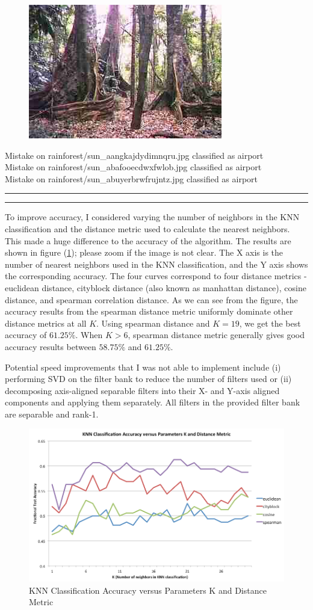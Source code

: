 \documentclass[12pt]{article}
\newcommand{\question}[2] {\vspace{.25in} \hrule\vspace{0.5em} \noindent{\bf #1: #2} \vspace{0.5em} \hrule \vspace{.10in}}
\begin{document}
\begin{figure}
\centering
\includegraphics[width=0.5\linewidth]{../dat/rainforest/sun_aalbylumieujfxrc.jpg}
\end{figure}
Mistake on rainforest/sun\_aangkajdydimnqru.jpg classified as airport \\
Mistake on rainforest/sun\_abafooecdwxfwlob.jpg classified as airport \\
Mistake on rainforest/sun\_abuyerbrwfrujntz.jpg classified as airport \\

\question{3.2}{Improvements in Accuracy}

To improve accuracy, I considered varying the number of neighbors in the KNN classification and the distance metric used to calculate the nearest neighbors. This made a huge difference to the accuracy of the algorithm. The results are shown in figure (\ref{fig:accuracy}); please zoom if the image is not clear. The X axis is the number of nearest neighbors used in the KNN classification, and the Y axis shows the corresponding accuracy. The four curves correspond to four distance metrics - euclidean distance, cityblock distance (also known as manhattan distance), cosine distance, and spearman correlation distance. As we can see from the figure, the accuracy results from the spearman distance metric uniformly dominate other distance metrics at all $K$. Using spearman distance and $K=19$, we get the best accuracy of $61.25\%$. When $K>6$, spearman distance metric generally gives good accuracy results between $58.75\%$ and $61.25\%$.

Potential speed improvements that I was not able to implement include (i) performing SVD on the filter bank to reduce the number of filters used or (ii) decomposing axis-aligned separable filters into their X- and Y-axis aligned components and applying them separately. All filters in the provided filter bank are separable and rank-1.

\begin{figure}
\centering
\includegraphics[width=\linewidth]{images/accuracy.png}
\caption{KNN Classification Accuracy versus Parameters K and Distance Metric}
\label{fig:accuracy}
\end{figure}
\end{document}
